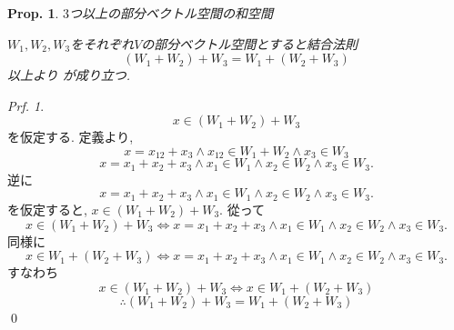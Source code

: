 \documentclass[a4paper,10pt,report]{amsart}
\theoremstyle{plain}
\newtheorem{prop}{Prop.}[section]
\theoremstyle{definition}
\theoremstyle{remark}
\newtheorem{prf}{Prf.}
\begin{document}
\begin{leftbar}
    \begin{prop}\(3\)つ以上の部分ベクトル空間の和空間\par
        \(W_{1},W_{2},W_{3}\)をそれぞれ\(V\)の部分ベクトル空間とすると結合法則
        \begin{equation}
            (W_{1}+W_{2})+W_{3}=W_{1}+(W_{2}+W_{3})
        \end{equation}以上より
        が成り立つ. 
    \end{prop}
\end{leftbar}
\begin{prf}
    \begin{equation*}
        x\in (W_{1}+W_{2})+W_{3}
    \end{equation*}
    を仮定する. 定義より, 
    \begin{equation*}
        x=x_{12}+x_{3}\wedge x_{12}\in W_{1}+W_{2}\wedge x_{3}\in W_{3}
    \end{equation*}
    \begin{equation*}
        x=x_{1}+x_{2}+x_{3}\wedge x_{1}\in W_{1}\wedge x_{2}\in W_{2}\wedge x_{3}\in W_{3}.
    \end{equation*}
    逆に
    \begin{equation*}
        x=x_{1}+x_{2}+x_{3}\wedge x_{1}\in W_{1}\wedge x_{2}\in W_{2}\wedge x_{3}\in W_{3}.
    \end{equation*}
    を仮定すると, \(x\in (W_{1}+W_{2})+W_{3}\).
    從って
    \begin{equation*}
        x\in (W_{1}+W_{2})+W_{3}\Leftrightarrow x=x_{1}+x_{2}+x_{3}\wedge x_{1}\in W_{1}\wedge x_{2}\in W_{2}\wedge x_{3}\in W_{3}.
    \end{equation*}
    同様に
    \begin{equation*}
        x\in W_{1}+(W_{2}+W_{3})\Leftrightarrow x=x_{1}+x_{2}+x_{3}\wedge x_{1}\in W_{1}\wedge x_{2}\in W_{2}\wedge x_{3}\in W_{3}.
    \end{equation*}
    すなわち
    \begin{equation*}
        x\in (W_{1}+W_{2})+W_{3}\Leftrightarrow x\in W_{1}+(W_{2}+W_{3})
    \end{equation*}
    \begin{equation*}
        \therefore (W_{1}+W_{2})+W_{3}= W_{1}+(W_{2}+W_{3})
    \end{equation*}
    \qed{}
\end{prf}
\end{document}
